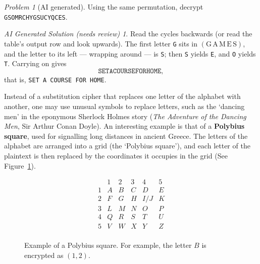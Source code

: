 \documentclass{article}
\theoremstyle{plain}
\theoremstyle{definition}
\theoremstyle{remark}
\newtheorem{problem}[theorem]{Problem}
\newtheorem*{aisolution}{AI Generated Solution (needs review)}
\numberwithin{theorem}{section}
\newcommand{\bespokedemo}[1]{\href{bespoke:#1}{\textsf{[\,interactive: #1\,]}}}
\newif\ifweb \webfalse
\DeclareRobustCommand{\webonly}[1]{\ifweb#1\fi}
\DeclareRobustCommand{\printonly}[1]{\ifweb\else#1\fi}
\begin{document}
\begin{problem}[AI generated]
Using the same permutation, decrypt \texttt{GSOMRCHYGSUCYQCES}.
\end{problem}
\begin{aisolution}
Read the cycles backwards (or read the table's output row and look upwards).  The first letter \texttt{G} sits in $(\mathrm{G\,A\,M\,E\,S})$, and the letter to its left --- wrapping around --- is \texttt{S}; then \texttt{S} yields \texttt{E}, and \texttt{O} yields \texttt{T}.  Carrying on gives
\[
	\texttt{SETACOURSEFORHOME},
\]
that is, \texttt{SET A COURSE FOR HOME}.
\end{aisolution}

Instead of a substitution cipher that replaces one letter of the alphabet with another, one may use unusual symbols to replace letters, such as the `dancing men' in the eponymous Sherlock Holmes story (\emph{The Adventure of the Dancing Men}, Sir Arthur Conan Doyle).  An interesting example is that of a \textbf{Polybius square}, used for signalling long distances in ancient Greece.  The letters of the alphabet are arranged into a grid (the `Polybius square'), and each letter of the plaintext is then replaced by the coordinates it occupies in the grid (See Figure~\ref{fig:polybius-example}).

\begin{figure}
\printonly{$$
\begin{array}{c|ccccc}
  & 1 & 2 & 3 & 4 & 5 \\
\hline
1 & A & B & C & D & E \\
2 & F & G & H & I/J & K \\
3 & L & M & N & O & P \\
4 & Q & R & S & T & U \\
5 & V & W & X & Y & Z \\
\end{array}
$$}%
\webonly{\begin{center}\bespokedemo{polybius-demo}\end{center}}
\caption{Example of a Polybius square.  For example, the letter $B$ is encrypted as $(1,2)$.\webonly{  Hover a letter to read off its coordinates.}}
\label{fig:polybius-example}
\end{figure}

\webonly{\bespokedemo{polybius-tool}}
\end{document}
